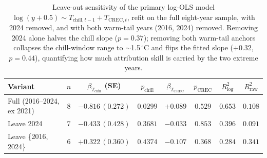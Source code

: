 \begin{table}[H]
\caption{Leave-out sensitivity of the primary log-OLS model
$\log(y+0.5)\sim T_{\text{chill},t-1}+T_{\text{CREC},t}$, refit on the full
eight-year sample, with 2024 removed, and with both warm-tail years
(2016, 2024) removed. Removing 2024 alone halves the chill slope
($p=0.37$); removing both warm-tail anchors collapses the chill-window
range to $\sim$1.5\,$^{\circ}$C and flips the fitted slope
($+0.32$, $p=0.44$), quantifying how much attribution skill is carried
by the two extreme years.\label{tab:sens_leave_out}}
\centering
\footnotesize
\begin{tabular}{lccccccc}
\toprule
\textbf{Variant} & \textbf{$n$} & \textbf{$\beta_{T_{\text{chill}}}$ (SE)} & \textbf{$p_{\text{chill}}$} & \textbf{$\beta_{T_{\text{CREC}}}$} & \textbf{$p_{\text{CREC}}$} & \textbf{$R^{2}_{\log}$} & \textbf{$R^{2}_{\text{raw}}$} \\
\midrule
Full (2016--2024, ex 2021)         & 8 & $-0.816\,(0.272)$ & $0.0299$ & $+0.089$ & $0.529$ & $0.653$ & $0.108$ \\
Leave 2024                          & 7 & $-0.433\,(0.428)$ & $0.3681$ & $-0.033$ & $0.853$ & $0.396$ & $0.091$ \\
Leave \{2016, 2024\}                & 6 & $+0.322\,(0.360)$ & $0.4374$ & $-0.107$ & $0.368$ & $0.284$ & $0.341$ \\
\bottomrule
\end{tabular}
\end{table}
